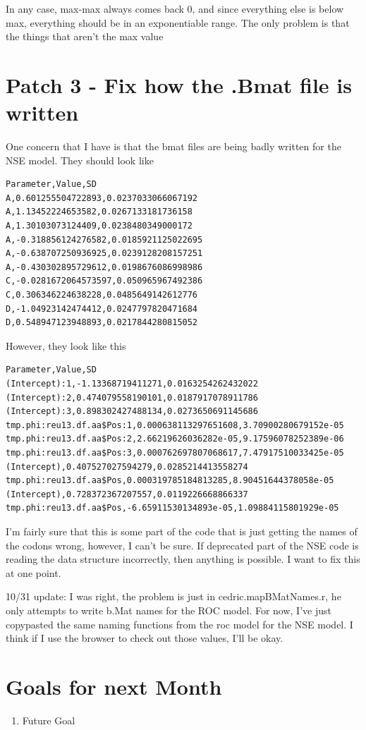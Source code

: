 In any case, max-max always comes back 0, and since everything else is below max, everything should be in an exponentiable range. The only problem is that the things that aren't the max value 

\section{Patch 3 - Fix how the .Bmat file is written}

One concern that I have is that the bmat files are being badly written for the NSE model. They should look like 

\begin{verbatim}
Parameter,Value,SD
A,0.601255504722893,0.0237033066067192
A,1.13452224653582,0.0267133181736158
A,1.30103073124409,0.0238480349000172
A,-0.318856124276582,0.0185921125022695
A,-0.638707250936925,0.0239128208157251
A,-0.430302895729612,0.0198676086998986
C,-0.0281672064573597,0.050965967492386
C,0.306346224638228,0.0485649142612776
D,-1.04923142474412,0.0247797820471684
D,0.548947123948893,0.0217844280815052
\end{verbatim}

However, they look like this

\begin{verbatim}
Parameter,Value,SD
(Intercept):1,-1.13368719411271,0.0163254262432022
(Intercept):2,0.474079558190101,0.0187917078911786
(Intercept):3,0.898302427488134,0.0273650691145686
tmp.phi:reu13.df.aa$Pos:1,0.000638113297651608,3.70900280679152e-05
tmp.phi:reu13.df.aa$Pos:2,2.66219626036282e-05,9.17596078252389e-06
tmp.phi:reu13.df.aa$Pos:3,0.000762697807068617,7.47917510033425e-05
(Intercept),0.407527027594279,0.0285214413558274
tmp.phi:reu13.df.aa$Pos,0.000319785184813285,8.90451644378058e-05
(Intercept),0.728372367207557,0.0119226668866337
tmp.phi:reu13.df.aa$Pos,-6.65911530134893e-05,1.09884115801929e-05
\end{verbatim}


I'm fairly sure that this is some part of the code that is just getting the names of the codons wrong, however, I can't be sure. If deprecated part of the NSE code is reading the data structure incorrectly, then anything is possible. I want to fix this at one point.

10/31 update: I was right, the problem is just in cedric.mapBMatNames.r, he only attempts to write b.Mat names for the ROC model. For now, I've just copypasted the same naming functions from the roc model for the NSE model. I think if I use the browser to check out those values, I'll be okay.




\section{Goals for next Month}
\begin{enumerate}
\item Future Goal
\end{enumerate}


